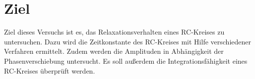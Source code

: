\section{Ziel}
Ziel dieses Versuchs ist es, das Relaxationsverhalten eines RC-Kreises zu untersuchen.
Dazu wird die Zeitkonstante des RC-Kreises mit Hilfe verschiedener Verfahren ermittelt. 
Zudem werden die Amplituden in Abhängigkeit der Phasenverschiebung untersucht. 
Es soll außerdem die Integrationsfähigkeit eines RC-Kreises überprüft werden.